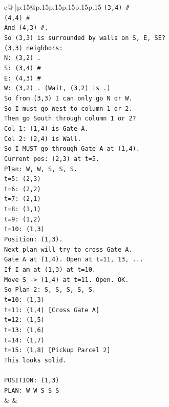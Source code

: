 \documentclass{article}
\begin{document}
{\begin{supertabular}{c@{$\;$}|p{.15\linewidth}@{}p{.15\linewidth}p{.15\linewidth}p{.15\linewidth}p{.15\linewidth}p{.15\linewidth}}
{{{\texttt{(3,4) \#} \\
\texttt{(4,4) \#} \\
\texttt{And (4,3) \#.} \\
\texttt{So (3,3) is surrounded by walls on S, E, SE?} \\
\texttt{(3,3) neighbors:} \\
\texttt{N: (3,2) .} \\
\texttt{S: (3,4) \#} \\
\texttt{E: (4,3) \#} \\
\texttt{W: (3,2) . (Wait, (3,2) is .)} \\
\texttt{So from (3,3) I can only go N or W.} \\
\texttt{So I must go West to column 1 or 2.} \\
\texttt{Then go South through column 1 or 2?} \\
\texttt{Col 1: (1,4) is Gate A.} \\
\texttt{Col 2: (2,4) is Wall.} \\
\texttt{So I MUST go through Gate A at (1,4).} \\
\texttt{Current pos: (2,3) at t=5.} \\
\texttt{Plan: W, W, S, S, S.} \\
\texttt{t=5: (2,3)} \\
\texttt{t=6: (2,2)} \\
\texttt{t=7: (2,1)} \\
\texttt{t=8: (1,1)} \\
\texttt{t=9: (1,2)} \\
\texttt{t=10: (1,3)} \\
\texttt{Position: (1,3).} \\
\texttt{Next plan will try to cross Gate A.} \\
\texttt{Gate A at (1,4). Open at t=11, 13, ...} \\
\texttt{If I am at (1,3) at t=10.} \\
\texttt{Move S {-}> (1,4) at t=11. Open. OK.} \\
\texttt{So Plan 2: S, S, S, S, S.} \\
\texttt{t=10: (1,3)} \\
\texttt{t=11: (1,4) {[}Cross Gate A{]}} \\
\texttt{t=12: (1,5)} \\
\texttt{t=13: (1,6)} \\
\texttt{t=14: (1,7)} \\
\texttt{t=15: (1,8) {[}Pickup Parcel 2{]}} \\
\texttt{This looks solid.} \\
\\ 
\texttt{POSITION: (1,3)} \\
\texttt{PLAN: W W S S S} \\
            }
        }
    }
    & & \\ \\


\end{supertabular}}
\end{document}
